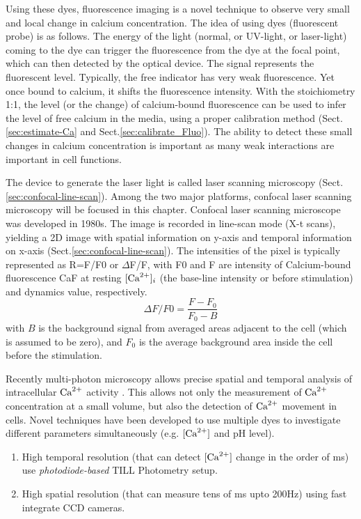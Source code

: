 Using these dyes, fluorescence imaging is a novel technique to observe very
small and local change in calcium concentration. The idea of using dyes
(fluorescent probe) is as follows. The energy of the light (normal, or UV-light,
or laser-light) coming to the dye can trigger the fluorescence from the dye at
the focal point, which can then detected by the optical device. The signal
represents the fluorescent level.
Typically, the free indicator has very weak fluorescence. Yet once bound to
calcium, it shifts the fluorescence intensity. With the stoichiometry 1:1, the
level (or the change) of calcium-bound fluorescence can be used to infer the
level of free calcium in the media, using a proper calibration method
(Sect.\ref{sec:estimate-Ca} and Sect.\ref{sec:calibrate_Fluo}). The ability to
detect these small changes in calcium concentration is important as many weak
interactions are important in cell functions.

The device to generate the laser light is called laser scanning microscopy
(Sect.\ref{sec:confocal-line-scan}). Among the two major platforms, confocal
laser scanning microscopy will be focused in this chapter. Confocal laser
scanning microscope was developed in 1980s. The image is recorded in line-scan
mode (X-t scans), yielding a 2D image with spatial information on y-axis and
temporal information on x-axis (Sect.\ref{sec:confocal-line-scan}).
The intensities of the pixel is typically represented as R=F/F0 or $\Delta $F/F,
with F0 and F are intensity of Calcium-bound fluorescence CaF at resting
$[{\text{Ca}^{2+}}]_i$ (the base-line intensity or before stimulation) and dynamics value,
respectively.
\begin{equation}
\Delta F/F0 = \frac{F-F_0}{F_0-B}
\end{equation}
with $B$ is the background signal from averaged areas
adjacent to the cell (which is assumed to be zero), and $F_0$ is the average
background area inside the cell before the stimulation.

\begin{framed}
 
Recently multi-photon microscopy allows precise spatial and temporal analysis of
intracellular ${\text{Ca}^{2+}}$ activity \citep{denk1997, wilt2009}. This allows not only
the measurement of ${\text{Ca}^{2+}}$ concentration at a small volume, but also the detection
of ${\text{Ca}^{2+}}$ movement in cells. Novel techniques have been developed to use multiple
dyes to investigate different parameters simultaneously (e.g. $[{\text{Ca}^{2+}}]$ and pH
level).
\begin{enumerate}
  \item High temporal resolution (that can detect $[{\text{Ca}^{2+}}]$ change in the order
  of ms) use {\it photodiode-based} TILL Photometry setup.
  \item High spatial resolution (that can measure tens of ms upto 200Hz) using
  fast integrate CCD cameras.
\end{enumerate}
\end{framed}

